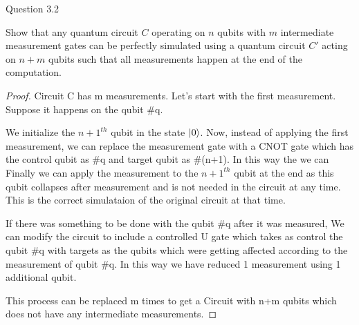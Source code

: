 \begin{solution}{Question 3.2}\label{ques:32}
    \begin{question}
    Show that any quantum circuit $C$ operating on $n$ qubits with $m$ intermediate measurement gates can be perfectly simulated using a quantum circuit $C'$ acting on $n + m$ qubits such that all measurements happen at the end of the computation.
    \end{question}
    \tcblower{}
    \begin{proof}
    Circuit C has m measurements. Let's start with the first measurement. Suppose it happens on the qubit \#q.\par
    We initialize the $n+1^{th}$ qubit in the state $\ket{0}$. Now, instead of applying the first measurement, we can replace the measurement gate with a CNOT gate which has the control qubit as \#q and target qubit as \#(n+1). In this way the we can  Finally we can apply the measurement to the $n+1^{th}$ qubit at the end as this qubit collapses after measurement and is not needed in the circuit at any time. This is the correct simulataion of the original circuit at that time.\par
    If there was something to be done with the qubit \#q after it was measured, We can modify the circuit to include a controlled U gate which takes as control the qubit \#q with targets as the qubits which were getting affected according to the measurement of qubit \#q. In this way we have reduced 1 measurement using 1 additional qubit.\par
    This process can be replaced m times to get a Circuit with n+m qubits which does not have any intermediate measurements.
    \end{proof}
\end{solution}
